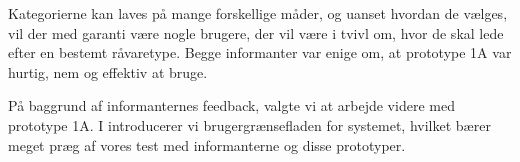 Kategorierne kan laves på mange forskellige måder, og uanset hvordan de vælges, vil der med garanti være nogle brugere, der vil være i tvivl om, hvor de skal lede efter en bestemt råvaretype. Begge informanter var enige om, at prototype 1A var hurtig, nem og effektiv at bruge.

På baggrund af informanternes feedback, valgte vi at arbejde videre med prototype 1A. I  introducerer vi brugergrænsefladen for systemet, hvilket bærer meget præg af vores test med informanterne og disse prototyper.

